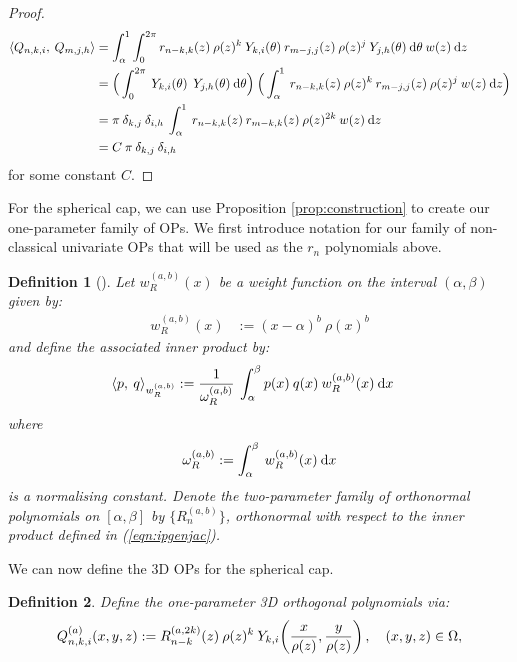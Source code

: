 \documentclass[11pt, oneside]{article}   	%
\newcommand{\genjac}{R}
\newcommand{\genjacnmk}{\genjac_{n-k}}
\newcommand{\genjacw}{w_\genjac}
\newcommand{\normgenjac}{\omega_\genjac}
\newcommand{\scop}{Q}
\newcommand{\scopnki}{\scop_{n,k,i}}
\newcommand{\scopmjh}{\scop_{m,j,h}}
\newcommand{\scopnkia}{\scopnki^{(a)}}
\newcommand{\ch}{Y}
\newcommand{\chki}{\ch_{k,i}}
\newtheorem{definition}{Definition}
\begin{document}
\begin{proof}
\begin{align*}
	\ip< \scopnki, \: \scopmjh > &= \int_\alpha^1 \int_0^{2\pi} r_{n-k,k}(z) \: \rho(z)^k \: \ch_{k,i}(\theta) \: r_{m-j,j}(z) \: \rho(z)^j \: \ch_{j,h}(\theta) \: \D \theta \: w(z) \: \D z \\
	&= \Big(\int_0^{2\pi}  \: \ch_{k,i}(\theta) \: \: \ch_{j,h}(\theta) \: \D \theta \Big) \: \Big( \int_\alpha^1 \: r_{n-k,k}(z) \: \rho(z)^k \: r_{m-j,j}(z) \: \rho(z)^j \: w(z) \: \D z \Big) \\
	&= \pi \: \delta_{k,j} \: \delta_{i,h} \:  \int_\alpha^1 \: r_{n-k,k}(z) \: r_{m-k,k}(z) \: \rho(z)^{2k} \: w(z) \: \D z \\
	&= C \: \pi \: \delta_{k,j} \: \delta_{i,h}
\end{align*}
for some constant $C$.
\end{proof}

For the spherical cap, we can use Proposition \ref{prop:construction} to create our one-parameter family of OPs. We first introduce notation for our family of non-classical univariate OPs that will be used as the $r_n$ polynomials above.
\begin{definition}[\cite{snowball2019sparse}]\label{def:OPconstruction}
Let $\genjacw^{(a,b)}(x)$ be a weight function on the interval $(\alpha, \beta)$ given by:
\begin{align*}
	\genjacw^{(a,b)}(x) &:= (x - \alpha)^{b} \: \rho(x)^{b}
\end{align*}
and define the associated inner product by:
\begin{align}
	\ip< p, \: q >_{\genjacw^{(a,b)}} &:= \frac{1}{\normgenjac^{(a,b)}} \: \int_\alpha^\beta p(x) \: q(x) \: \genjacw^{(a,b)}(x) \: \D x \label{eqn:ipgenjac}
\end{align}
where
\begin{align}
	\normgenjac^{(a,b)} := \int_\alpha^\beta \: \genjacw^{(a,b)}(x) \: \D x \label{eqn:ipnormalisation}
\end{align}
is a normalising constant.
Denote the two-parameter family of orthonormal polynomials on $[\alpha,\beta]$ by $\{\genjac_n^{(a,b)}\}$, orthonormal with respect to the inner product defined in (\ref{eqn:ipgenjac}).
\end{definition}

We can now define the 3D OPs for the spherical cap.
\begin{definition}\label{def:constuction}
Define the one-parameter 3D orthogonal polynomials via:
\begin{align}
	\scopnkia(x,y,z) := \genjacnmk^{(a,2k)}(z) \: \rho(z)^k \: \chki\fpr(\frac{x}{\rho(z)}, \frac{y}{\rho(z)}), \quad (x,y,z) \in \Omega, 
\end{align}
\end{definition}
\end{document}
